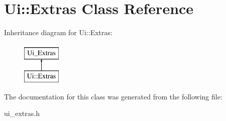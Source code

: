 \hypertarget{classUi_1_1Extras}{
\section{Ui::Extras Class Reference}
\label{classUi_1_1Extras}
}
Inheritance diagram for Ui::Extras:\begin{figure}[H]
\begin{center}
\leavevmode
\includegraphics[height=2.000000cm]{classUi_1_1Extras}
\end{center}
\end{figure}


The documentation for this class was generated from the following file:\begin{DoxyCompactItemize}
\item 
ui\_\-extras.h\end{DoxyCompactItemize}
